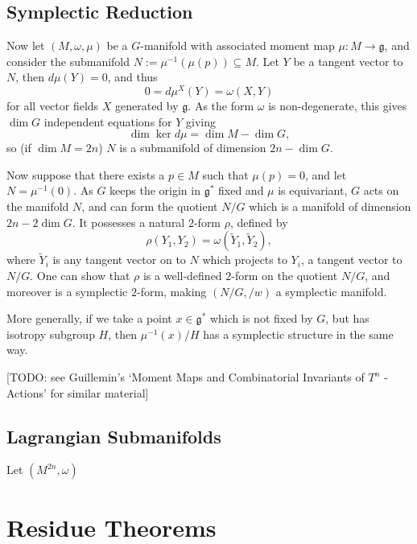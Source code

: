 \documentclass{article}
\newcommand{\ra}{\rightarrow}
\newcommand{\w}{\omega}
\newcommand{\mfg}{\mathfrak{g}}
\begin{document}
	\subsection{Symplectic Reduction}
	
	Now let $(M, \w, \mu)$ be a $G$-manifold with associated moment map $\mu : M \ra \mfg$, and consider the submanifold $N := \mu^{-1}(\mu(p)) \subseteq M$. Let $Y$ be a tangent vector to $N$, then $d\mu(Y) = 0$, and thus
	\[
		0 = d\mu^{X}(Y) = \w(X,Y)
	\]
	for all vector fields $X$ generated by $\mfg$. As the form $\w$ is non-degenerate, this gives $\dim G$ independent equations for $Y$ giving
	\[
		\dim \ker d\mu = \dim M - \dim G,
	\]
	so (if $\dim M = 2n$) $N$ is a submanifold of dimension $2n - \dim G$.
	
	Now suppose that there exists a $p \in M$ such that $\mu(p) = 0$, and let $N = \mu^{-1}(0)$. As $G$ keeps the origin in $\mfg^{\ast}$ fixed and $\mu$ is equivariant, $G$ acts on the manifold $N$, and can form the quotient $N/G$ which is a manifold of dimension $2n - 2\dim G$. It possesses a natural $2$-form $\rho$, defined by
	\[
		\rho(Y_{1}, Y_{2}) = \w(\tilde{Y}_{1}, \tilde{Y}_{2}),
	\]
	where $\tilde{Y}_{i}$ is any tangent vector on to $N$ which projects to $Y_{i}$, a tangent vector to $N/G$. One can show that $\rho$ is a well-defined $2$-form on the quotient $N/G$, and moreover is a symplectic $2$-form, making $(N/G, /w)$ a symplectic manifold.
	
	More generally, if we take a point $x \in \mfg^{\ast}$ which is not fixed by $G$, but has isotropy subgroup $H$, then $\mu^{-1}(x)/H$ has a symplectic structure in the same way.
	
	[TODO: see Guillemin's `Moment Maps and Combinatorial Invariants of $T^{n}$ -Actions' for similar material]
	
	\subsection{Lagrangian Submanifolds}
	
	Let $(M^{2n}, \w)$ 
	
	
	
	
	
	
	
	
	
	
	
	
	
	
	
	
	
	
	
	
	\section{Residue Theorems}
	
\end{document}
